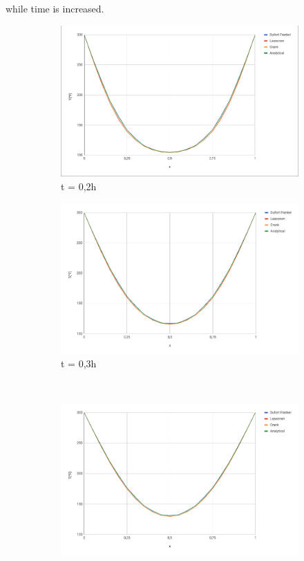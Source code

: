 \documentclass{article}
\begin{document}
        while time is increased.
        \begin{figure}[H]
            \centering
            \begin{subfigure}[b]{0.45\textwidth}
                \includegraphics[width=\textwidth]{t02.png}
                \caption{t = 0,2h}
            \end{subfigure}
            \begin{subfigure}[b]{0.45\textwidth}
                \includegraphics[width=\textwidth]{t03.png}
                \caption{t = 0,3h}
            \end{subfigure}
            \\
            \begin{subfigure}[b]{0.45\textwidth}
                \includegraphics[width=\textwidth]{t04.png}

\end{subfigure}
\end{figure}
\end{document}
